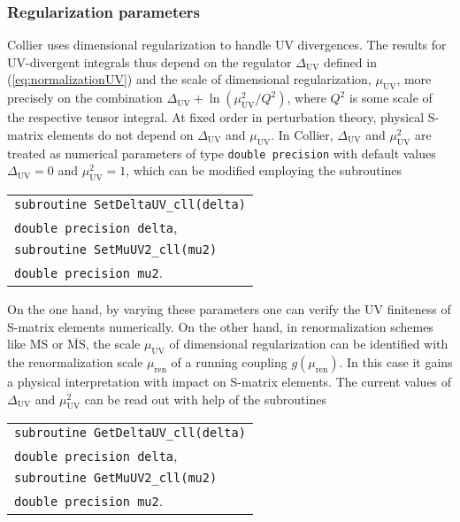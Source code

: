 \documentclass[preprint,sort&compress,12pt]{elsarticle}
\makeatletter
\def\bce{\begin{center}}
\def\ece{\end{center}}
\def\refeq#1{\mbox{(\ref{#1})}}
\newcommand{\UV}{{\mathrm{UV}}}
\newcommand{\collier}{{\sc Collier}}
\newlength{\parwidth}\newlength{\colonewidth}%
\newcommand{\cpcsub}[1]
{%
\setlength{\parwidth}{\textwidth}\addtolength{\parwidth}{-2.1em}%
\bce
\begin{tabular}[t]{@{}p{\parwidth}@{}}
#1
\end{tabular}
\ece
}%
\makeatother
\begin{document}
\subsubsection{Regularization parameters}
{\collier} uses dimensional regularization to handle UV divergences. The results for
UV-divergent integrals thus depend on the regulator
$\Delta_{\UV}$ defined in \refeq{eq:normalizationUV} and the scale of dimensional regularization, 
$\mu_\UV$, more precisely on the combination
$\Delta_{\UV}+\ln({\mu^2_\UV}/{Q^2})$, 
where $Q^2$ is some
scale of the respective tensor integral. At fixed order in perturbation theory,
physical S-matrix elements do not depend on $\Delta_{\UV}$ and $\mu_\UV$. In {\collier}, $\Delta_{\UV}$ and $\mu_\UV^2$
are treated as numerical parameters of type {\tt double precision} 
with default values $\Delta_{\UV}=0$ and $\mu_\UV^2=1$, 
which can be modified employing the subroutines
\cpcsub{
{\tt subroutine  SetDeltaUV\_cll(delta)}\\
{\tt double precision delta}\;, \\
{\tt subroutine  SetMuUV2\_cll(mu2)}\\
{\tt double precision mu2}\;. \\
}
On the one hand, by varying these parameters one can verify the 
UV finiteness of S-matrix elements numerically. On the other hand,
in renormalization schemes like MS or $\overline{\textrm{MS}}$, the scale $\mu_\UV$ of dimensional regularization can be identified with the renormalization scale $\mu_\textrm{ren}$
of a running coupling $g(\mu_\textrm{ren})$.
In this case it gains a physical interpretation with impact on S-matrix elements. The current values
of $\Delta_{\UV}$ and $\mu_\UV^2$ can be read out with help of the subroutines
\cpcsub{
{\tt subroutine  GetDeltaUV\_cll(delta)}\\
{\tt double precision delta}\;, \\
{\tt subroutine  GetMuUV2\_cll(mu2)}\\
{\tt double precision mu2}\;. \\
}
\end{document}
